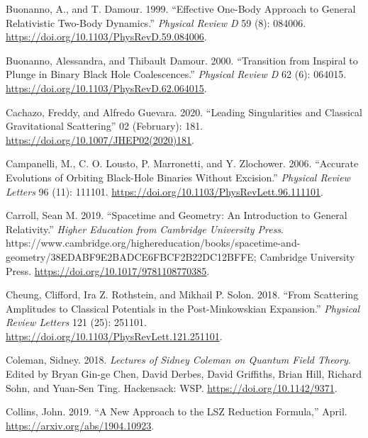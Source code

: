 \documentclass[
  11pt,
  a4paper,
  DIV=11,
  numbers=noendperiod,
  oneside]{scrreprt}
\newlength{\cslhangindent}
\newlength{\cslentryspacingunit} %
\newenvironment{CSLReferences}[2] %
 {%
  \setlength{\parindent}{0pt}
  \ifodd #1
  \let\oldpar\par
  \def\par{\hangindent=\cslhangindent\oldpar}
  \fi
  \setlength{\parskip}{#2\cslentryspacingunit}
 }%
 {}
\DeclareRobustCommand{\[}{\begin{equation}}
\DeclareRobustCommand{\]}{\end{equation}}
\begin{document}
\begin{CSLReferences}{1}{0}
\leavevmode{}%
Buonanno, A., and T. Damour. 1999. {``Effective One-Body Approach to
General Relativistic Two-Body Dynamics.''} \emph{Physical Review D} 59
(8): 084006. \url{https://doi.org/10.1103/PhysRevD.59.084006}.

\leavevmode{}%
Buonanno, Alessandra, and Thibault Damour. 2000. {``Transition from
Inspiral to Plunge in Binary Black Hole Coalescences.''} \emph{Physical
Review D} 62 (6): 064015.
\url{https://doi.org/10.1103/PhysRevD.62.064015}.

\leavevmode{}%
Cachazo, Freddy, and Alfredo Guevara. 2020. {``Leading {Singularities}
and {Classical Gravitational Scattering}''} 02 (February): 181.
\url{https://doi.org/10.1007/JHEP02(2020)181}.

\leavevmode{}%
Campanelli, M., C. O. Lousto, P. Marronetti, and Y. Zlochower. 2006.
{``Accurate {Evolutions} of {Orbiting Black-Hole Binaries} Without
{Excision}.''} \emph{Physical Review Letters} 96 (11): 111101.
\url{https://doi.org/10.1103/PhysRevLett.96.111101}.

\leavevmode{}%
Carroll, Sean M. 2019. {``Spacetime and {Geometry}: {An Introduction} to
{General Relativity}.''} \emph{Higher Education from Cambridge
University Press}.
https://www.cambridge.org/highereducation/books/spacetime-and-geometry/38EDABF9E2BADCE6FBCF2B22DC12BFFE;
{Cambridge University Press}.
\url{https://doi.org/10.1017/9781108770385}.

\leavevmode{}%
Cheung, Clifford, Ira Z. Rothstein, and Mikhail P. Solon. 2018. {``From
{Scattering Amplitudes} to {Classical Potentials} in the
{Post-Minkowskian Expansion}.''} \emph{Physical Review Letters} 121
(25): 251101. \url{https://doi.org/10.1103/PhysRevLett.121.251101}.

\leavevmode{}%
Coleman, Sidney. 2018. \emph{Lectures of {Sidney Coleman} on {Quantum
Field Theory}}. Edited by Bryan Gin-ge Chen, David Derbes, David
Griffiths, Brian Hill, Richard Sohn, and Yuan-Sen Ting. {Hackensack}:
{WSP}. \url{https://doi.org/10.1142/9371}.

\leavevmode{}%
Collins, John. 2019. {``A New Approach to the {LSZ} Reduction
Formula,''} April. \url{https://arxiv.org/abs/1904.10923}.


\end{CSLReferences}
\end{document}
